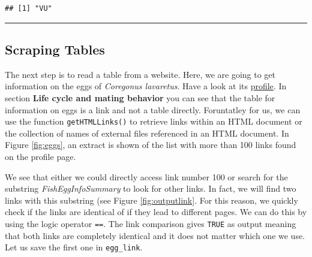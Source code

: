 \documentclass[
]{book}
\newenvironment{Shaded}{\begin{snugshade}}{\end{snugshade}}
\newcommand{\DataTypeTok}[1]{\textcolor[rgb]{0.13,0.29,0.53}{#1}}
\newcommand{\KeywordTok}[1]{\textcolor[rgb]{0.13,0.29,0.53}{\textbf{#1}}}
\newcommand{\NormalTok}[1]{#1}
\newcommand{\OperatorTok}[1]{\textcolor[rgb]{0.81,0.36,0.00}{\textbf{#1}}}
\newcommand{\StringTok}[1]{\textcolor[rgb]{0.31,0.60,0.02}{#1}}
\begin{document}
\begin{Shaded}
\end{Shaded}

\begin{verbatim}
## [1] "VU"
\end{verbatim}

\begin{center}\rule{0.5\linewidth}{0.5pt}\end{center}

\hypertarget{scraping-tables}{%
\subsection{Scraping Tables}\label{scraping-tables}}

The next step is to read a table from a website. Here, we are going to get information on the eggs of \emph{Coregonus lavaretus}. Have a look at its \href{https://www.fishbase.de/summary/Coregonus-lavaretus.html}{profile}. In section \textbf{Life cycle and mating behavior} you can see that the table for information on eggs is a link and not a table directly. Foruntatley for us, we can use the function \texttt{getHTMLLinks()} to retrieve links within an HTML document or the collection of names of external files referenced in an HTML document. In Figure \ref{fig:eggs}, an extract is shown of the list with more than 100 links found on the profile page.

We see that either we could directly access link number 100 or search for the substring \emph{FishEggInfoSummary} to look for other links. In fact, we will find two links with this substring (see Figure \ref{fig:outputlink}. For this reason, we quickly check if the links are identical of if they lead to different pages. We can do this by using the logic operator \texttt{==}. The link comparison gives \texttt{TRUE} as output meaning that both links are completely identical and it does not matter which one we use. Let us save the first one in \texttt{egg\_link}.
\end{document}
